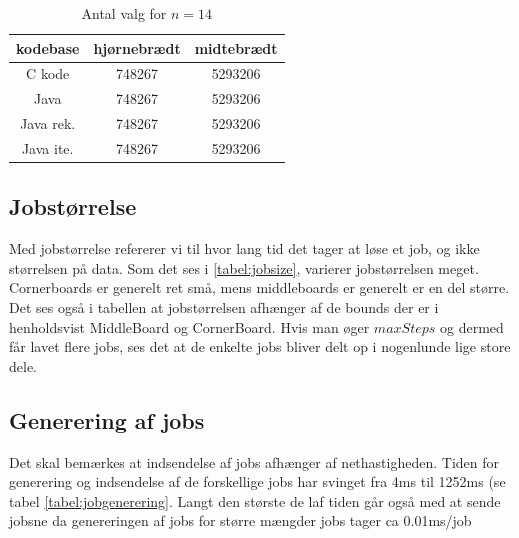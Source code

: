 \begin{table}
\begin{center}
\begin{tabular}{|c|c|c|}
\hline kodebase  & hjørnebrædt & midtebrædt \\
\hline C kode    &  748267           &  5293206           \\
\hline Java      &  748267           &  5293206           \\
\hline Java rek. &  748267           &  5293206           \\
\hline Java ite. &  748267           &  5293206           \\
\hline
\end{tabular}
\caption{Antal valg for $n=14$}
\label{table:backtrackkald}
\end{center}
\end{table}

\subsection{Jobstørrelse}

Med jobstørrelse refererer vi til hvor lang tid det tager at løse et job, og
ikke størrelsen på data.  Som det ses i \ref{tabel:jobsize}, varierer
jobstørrelsen meget. Cornerboards er generelt ret små, mens middleboards er
generelt er en del større. Det ses også i tabellen at jobstørrelsen afhænger af
de bounds der er i henholdsvist MiddleBoard og CornerBoard. Hvis man øger
$maxSteps$ og dermed får lavet flere jobs, ses det at de enkelte jobs bliver
delt op i nogenlunde lige store dele.

\subsection{Generering af jobs}

Det skal bemærkes at indsendelse af jobs afhænger af nethastigheden. Tiden for
generering og indsendelse af de forskellige jobs har svinget fra 4ms til 1252ms
(se tabel \ref{tabel:jobgenerering}. Langt den største de laf tiden går også med
at sende jobsne da genereringen af jobs for større mængder jobs tager ca
0.01ms/job

